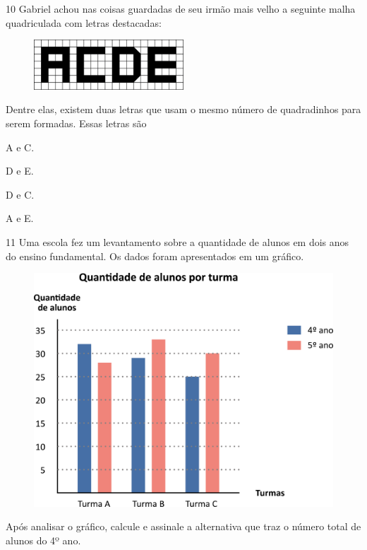 \num{10} Gabriel achou nas coisas guardadas de seu irmão mais velho a seguinte malha quadriculada com letras destacadas:

\begin{figure}[htpb!]
\centering
\includegraphics[width=0.5\textwidth]{./media/image96.png}
\end{figure}

Dentre elas, existem duas letras que usam o mesmo número de quadradinhos para serem formadas. Essas letras são

\begin{escolha}
\item
  A e C.
\item
  D e E.
\item
  D e C.
\item
  A e E.
\end{escolha}

\num{11} Uma escola fez um levantamento sobre a quantidade de alunos em dois anos
do ensino fundamental. Os dados foram apresentados em um gráfico.

\begin{figure}[htpb!]
\centering
\includegraphics[width=\textwidth]{./media/image97.png}
\end{figure}

Após analisar o gráfico, calcule e assinale a alternativa que traz o número total de alunos do 4º ano.

